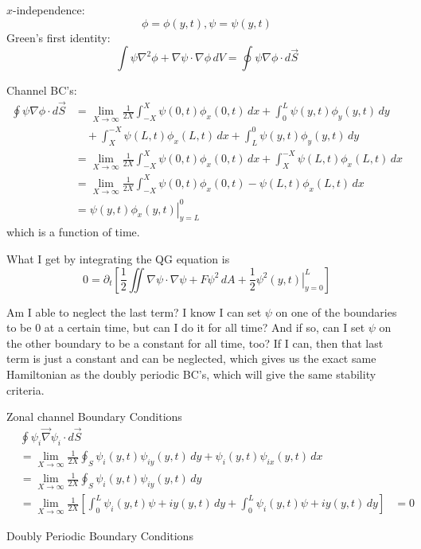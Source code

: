 \documentclass[12pt]{article}
\begin{document}
$x$-independence:
$$
\phi = \phi(y, t), \psi = \psi(y, t)
$$
Green's first identity:
$$
\int \psi \nabla^2 \phi + \nabla \psi \cdot \nabla \phi \, dV = \oint \psi \nabla \phi \cdot d \vec S
$$

Channel BC's:
\begin{align*}
    \oint \psi \nabla \phi \cdot d \vec S &= \lim_{X \rightarrow \infty} \frac{1}{2X} \int_{-X}^X \psi(0,t) \phi_x(0,t) \, dx + \int_0^L \psi(y,t) \phi_y(y,t) \, dy  \\
     &\quad + \int_X^{-X} \psi(L,t) \phi_x(L,t) \, dx + \int_L^0 \psi(y,t) \phi_y(y,t) \, dy \\
     &= \lim_{X \rightarrow \infty} \frac{1}{2X} \int_{-X}^X \psi(0,t) \phi_x(0,t) \, dx + \int_X^{-X} \psi(L,t) \phi_x(L,t) \, dx \\
     &= \lim_{X \rightarrow \infty} \frac{1}{2X} \int_{-X}^X \psi(0,t) \phi_x(0,t) - \psi(L,t) \phi_x(L,t) \, dx \\
     &= \left. \psi(y,t) \phi_x(y,t) \right|_{y=L}^0
\end{align*}
which is a function of time.

What I get by integrating the QG equation is
$$
    0= \partial_t \left[ \frac12 \iint \nabla\psi\cdot\nabla\psi + F\psi^2 \, dA + \frac12 \left. \psi^2(y,t) \right|_{y=0}^L \right]
$$

Am I able to neglect the last term? I know I can set $\psi$ on one of the boundaries to be 0 at a certain time, but can I do it for all time? And if so, can I set $\psi$ on the other boundary to be a constant for all time, too? If I can, then that last term is just a constant and can be neglected, which gives us the exact same Hamiltonian as the doubly periodic BC's, which will give the same stability criteria.

\newpage

\begin{section}{Zonal channel Boundary Conditions}
    \begin{align*}
        &\oint \psi_i\vec\nabla\psi_i \cdot d\vec S \\
        &= \lim_{X \rightarrow \infty} \frac{1}{2X} \oint_S \psi_i(y,t) \psi_{iy}(y,t) \, dy + \psi_i(y,t) \psi_{ix}(y,t) \, dx \\
        &= \lim_{X \rightarrow \infty} \frac{1}{2X} \oint_S \psi_i(y,t) \psi_{iy}(y,t) \, dy \\
        &= \lim_{X \rightarrow \infty} \frac{1}{2X} \left[ \int_0^L \psi_i(y,t)\psi+{iy}(y,t) \, dy + \int_0^L \psi_i(y,t)\psi+{iy}(y,t) \, dy \right]
        &= 0
    \end{align*}
\end{section}

\begin{section}{Doubly Periodic Boundary Conditions}
\end{section}
\end{document}
